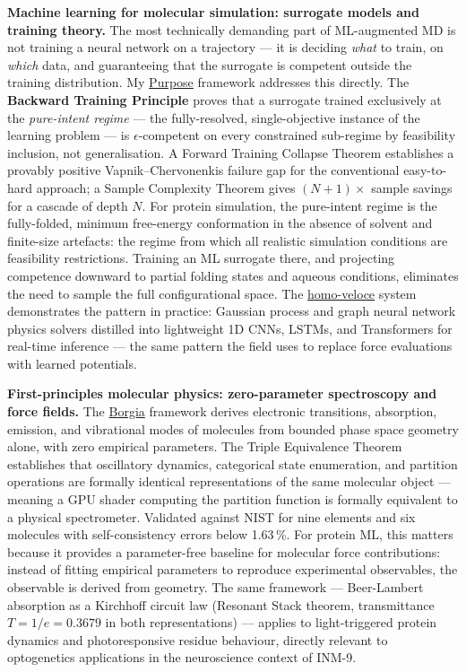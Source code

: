\documentclass[12pt,a4paper]{article}
\begin{document}
\textbf{Machine learning for molecular simulation: surrogate models and training theory.}
The most technically demanding part of ML-augmented MD is not training a neural
network on a trajectory --- it is deciding \emph{what} to train, on \emph{which}
data, and guaranteeing that the surrogate is competent outside the training distribution.
My \href{https://github.com/fullscreen-triangle/purpose}{Purpose} framework addresses
this directly. The \textbf{Backward Training Principle} proves that a surrogate trained
exclusively at the \emph{pure-intent regime} --- the fully-resolved, single-objective
instance of the learning problem --- is $\epsilon$-competent on every constrained
sub-regime by feasibility inclusion, not generalisation. A Forward Training Collapse
Theorem establishes a provably positive Vapnik--Chervonenkis failure gap for the
conventional easy-to-hard approach; a Sample Complexity Theorem gives $(N{+}1)\times$
sample savings for a cascade of depth $N$.
For protein simulation, the pure-intent regime is the fully-folded, minimum free-energy
conformation in the absence of solvent and finite-size artefacts: the regime from which
all realistic simulation conditions are feasibility restrictions. Training an ML
surrogate there, and projecting competence downward to partial folding states and
aqueous conditions, eliminates the need to sample the full configurational space.
The \href{https://github.com/fullscreen-triangle/homo-veloce}{homo-veloce} system
demonstrates the pattern in practice: Gaussian process and graph neural network
physics solvers distilled into lightweight 1D CNNs, LSTMs, and Transformers for
real-time inference --- the same pattern the field uses to replace force evaluations
with learned potentials.

\textbf{First-principles molecular physics: zero-parameter spectroscopy and force fields.}
The \href{https://honjo-masamune.vercel.app/tools}{Borgia} framework derives
electronic transitions, absorption, emission, and vibrational modes of molecules
from bounded phase space geometry alone, with zero empirical parameters.
The Triple Equivalence Theorem establishes that oscillatory dynamics, categorical
state enumeration, and partition operations are formally identical representations
of the same molecular object --- meaning a GPU shader computing the partition
function is formally equivalent to a physical spectrometer.
Validated against NIST for nine elements and six molecules with self-consistency
errors below 1.63\,\%.
For protein ML, this matters because it provides a parameter-free baseline for
molecular force contributions: instead of fitting empirical parameters to reproduce
experimental observables, the observable is derived from geometry.
The same framework --- Beer-Lambert absorption as a Kirchhoff circuit law
(Resonant Stack theorem, transmittance $T = 1/e = 0.3679$ in both representations) ---
applies to light-triggered protein dynamics and photoresponsive residue behaviour,
directly relevant to optogenetics applications in the neuroscience context of INM-9.
\end{document}
